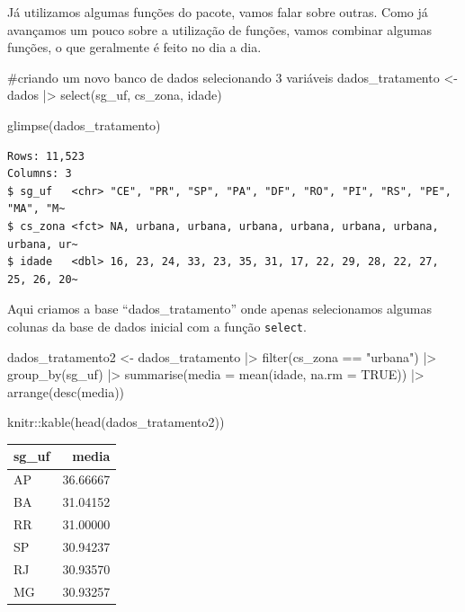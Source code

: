 \documentclass[
  letterpaper,
  DIV=11,
  numbers=noendperiod]{scrreprt}
\newenvironment{Shaded}{\begin{snugshade}}{\end{snugshade}}
\newcommand{\AttributeTok}[1]{\textcolor[rgb]{0.40,0.45,0.13}{#1}}
\newcommand{\CommentTok}[1]{\textcolor[rgb]{0.37,0.37,0.37}{#1}}
\newcommand{\ConstantTok}[1]{\textcolor[rgb]{0.56,0.35,0.01}{#1}}
\newcommand{\FunctionTok}[1]{\textcolor[rgb]{0.28,0.35,0.67}{#1}}
\newcommand{\NormalTok}[1]{\textcolor[rgb]{0.00,0.23,0.31}{#1}}
\newcommand{\OtherTok}[1]{\textcolor[rgb]{0.00,0.23,0.31}{#1}}
\newcommand{\SpecialCharTok}[1]{\textcolor[rgb]{0.37,0.37,0.37}{#1}}
\newcommand{\StringTok}[1]{\textcolor[rgb]{0.13,0.47,0.30}{#1}}
\begin{document}
Já utilizamos algumas funções do pacote, vamos falar sobre outras. Como
já avançamos um pouco sobre a utilização de funções, vamos combinar
algumas funções, o que geralmente é feito no dia a dia.

\begin{Shaded}
\begin{Highlighting}[]
\CommentTok{\#criando um novo banco de dados selecionando 3 variáveis}
\NormalTok{dados\_tratamento }\OtherTok{\textless{}{-}}\NormalTok{ dados }\SpecialCharTok{|\textgreater{}} 
  \FunctionTok{select}\NormalTok{(sg\_uf, cs\_zona, idade)}

\FunctionTok{glimpse}\NormalTok{(dados\_tratamento)}
\end{Highlighting}
\end{Shaded}

\begin{verbatim}
Rows: 11,523
Columns: 3
$ sg_uf   <chr> "CE", "PR", "SP", "PA", "DF", "RO", "PI", "RS", "PE", "MA", "M~
$ cs_zona <fct> NA, urbana, urbana, urbana, urbana, urbana, urbana, urbana, ur~
$ idade   <dbl> 16, 23, 24, 33, 23, 35, 31, 17, 22, 29, 28, 22, 27, 25, 26, 20~
\end{verbatim}

Aqui criamos a base ``dados\_tratamento'' onde apenas selecionamos
algumas colunas da base de dados inicial com a função \texttt{select}.

\begin{Shaded}
\begin{Highlighting}[]
\NormalTok{dados\_tratamento2 }\OtherTok{\textless{}{-}}\NormalTok{ dados\_tratamento }\SpecialCharTok{|\textgreater{}} 
  \FunctionTok{filter}\NormalTok{(cs\_zona }\SpecialCharTok{==} \StringTok{"urbana"}\NormalTok{) }\SpecialCharTok{|\textgreater{}} 
  \FunctionTok{group\_by}\NormalTok{(sg\_uf) }\SpecialCharTok{|\textgreater{}} 
  \FunctionTok{summarise}\NormalTok{(}\AttributeTok{media =} \FunctionTok{mean}\NormalTok{(idade, }\AttributeTok{na.rm =} \ConstantTok{TRUE}\NormalTok{)) }\SpecialCharTok{|\textgreater{}} 
  \FunctionTok{arrange}\NormalTok{(}\FunctionTok{desc}\NormalTok{(media))}

\NormalTok{knitr}\SpecialCharTok{::}\FunctionTok{kable}\NormalTok{(}\FunctionTok{head}\NormalTok{(dados\_tratamento2))}
\end{Highlighting}
\end{Shaded}

\begin{longtable}[]{@{}lr@{}}
\toprule()
sg\_uf & media \\
\midrule()
\endhead
AP & 36.66667 \\
BA & 31.04152 \\
RR & 31.00000 \\
SP & 30.94237 \\
RJ & 30.93570 \\
MG & 30.93257 \\
\bottomrule()
\end{longtable}
\end{document}
